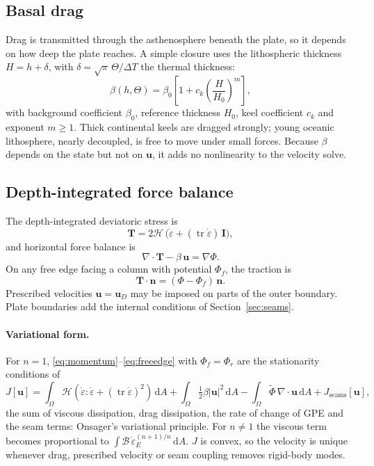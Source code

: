 \documentclass[11pt]{article}
\newcommand{\vect}[1]{\mathbf{#1}}
\newcommand{\edot}{\dot{\varepsilon}}
\newcommand{\dd}{\,\mathrm{d}}
\newcommand{\Hint}{\mathcal{H}}
\newcommand{\Bint}{\mathcal{B}}
\begin{document}
\subsection{Basal drag}
\label{sec:drag}
Drag is transmitted through the asthenosphere beneath the plate, so it depends on how deep the plate reaches. A simple closure uses the lithospheric thickness $H=h+\delta$, with $\delta=\sqrt\pi\,\Theta/\Delta T$ the thermal thickness:
\begin{equation}
  \beta(h,\Theta) = \beta_0\left[1+c_k\left(\frac{H}{H_0}\right)^{m}\right],
  \label{eq:drag}
\end{equation}
with background coefficient $\beta_0$, reference thickness $H_0$, keel coefficient $c_k$ and exponent $m\ge1$. Thick continental keels are dragged strongly; young oceanic lithosphere, nearly decoupled, is free to move under small forces. Because $\beta$ depends on the state but not on $\vect u$, it adds no nonlinearity to the velocity solve.

\subsection{Depth-integrated force balance}
The depth-integrated deviatoric stress is
\begin{equation}
  \vect{T} = 2\Hint\,\big(\edot+(\operatorname{tr}\edot)\,\vect{I}\big),
\end{equation}
and horizontal force balance is
\begin{equation}
  \nabla\cdot\vect{T} - \beta\,\vect{u} = \nabla\Phi .
  \label{eq:momentum}
\end{equation}
On any free edge facing a column with potential $\Phi_f$, the traction is
\begin{equation}
  \vect{T}\cdot\vect{n} = (\Phi-\Phi_f)\,\vect{n}.
  \label{eq:freeedge}
\end{equation}
Prescribed velocities $\vect{u}=\vect{u}_D$ may be imposed on parts of the outer boundary. Plate boundaries add the internal conditions of Section~\ref{sec:seams}.

\paragraph{Variational form.} For $n=1$, \eqref{eq:momentum}--\eqref{eq:freeedge} with $\Phi_f=\Phi_r$ are the stationarity conditions of
\begin{equation}
  J[\vect{u}] = \int_\Omega \Hint\left(\edot:\edot+(\operatorname{tr}\edot)^2\right)\dd A
  + \int_\Omega\tfrac12\beta|\vect{u}|^2\dd A
  - \int_\Omega\tilde\Phi\,\nabla\cdot\vect{u}\dd A
  + J_{\mathrm{seams}}[\vect{u}],
  \label{eq:functional}
\end{equation}
the sum of viscous dissipation, drag dissipation, the rate of change of GPE and the seam terms: Onsager's variational principle. For $n\neq1$ the viscous term becomes proportional to $\int\Bint\,\edot_E^{(n+1)/n}\dd A$. $J$ is convex, so the velocity is unique whenever drag, prescribed velocity or seam coupling removes rigid-body modes.
\end{document}

